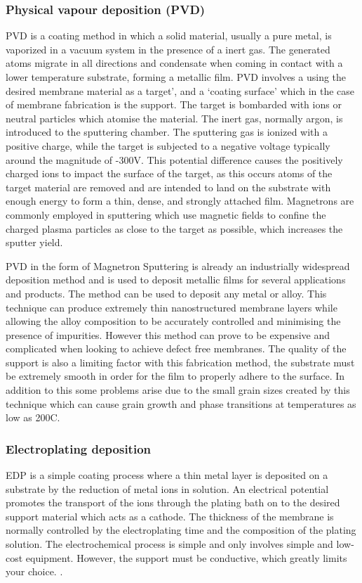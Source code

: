 \subsubsection*{Physical vapour deposition (PVD)}

PVD is a coating method in which a solid material, usually a pure metal, is vaporized in a vacuum system in the presence of a inert gas. The generated atoms migrate in all directions and condensate when coming in contact with a lower temperature substrate,  forming a metallic film. PVD involves a using the desired membrane material as a target’, and a ‘coating surface’ which in the case of membrane fabrication is the support. \cite{Peters2015a} The target is bombarded with ions or neutral particles which atomise the material. The inert gas, normally argon, is introduced to the sputtering chamber. The sputtering gas is ionized with a positive charge, while the target is subjected to a negative voltage typically around the magnitude of -300V. This potential difference causes the positively charged ions to impact the surface of the target, as this occurs atoms of the target material are removed and are intended to land on the substrate with enough energy to form a thin, dense, and strongly attached film. Magnetrons are commonly employed in sputtering which use magnetic fields to confine the charged plasma particles as close to the target as possible, which increases the sputter yield. 

PVD in the form of Magnetron Sputtering is already an industrially widespread deposition method and is used to deposit metallic films for several applications and products. \cite{Peters2015a} The method can be used to deposit any metal or alloy. This technique can produce extremely thin nanostructured membrane layers while allowing the alloy composition to be accurately controlled and minimising the presence of impurities. \cite{Xomeritakis1997,McCool1999}  However this method can prove to be expensive and complicated when looking to achieve defect free membranes. \cite{Keurentjes2004} The quality of the support is also a limiting factor with this fabrication method, the substrate must be extremely smooth in order for the film to properly adhere to the surface.  In addition to this some problems arise due to the small grain sizes created by this technique which can cause grain growth and phase transitions at temperatures as low as 200\textdegree C. \cite{Bryden1995}

\subsubsection*{Electroplating deposition}
EDP is a simple coating process where a thin metal layer is deposited on a substrate by the reduction of metal ions in solution. An electrical potential promotes the transport of the ions through the plating bath on to the desired support material which acts as a cathode. The thickness of the membrane is normally controlled by the electroplating time and the composition of the plating solution. The electrochemical process is simple and only involves simple and low-cost equipment. However, the support must be conductive, which greatly limits your choice. \cite{Yun2011a, NathanW.Ockwig2007a}.

